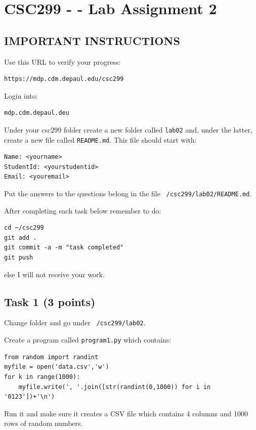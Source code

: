 \documentclass[12pt]{article}
\begin{document}
\section{CSC299 - - Lab Assignment 2}

\subsection*{IMPORTANT INSTRUCTIONS}

Use this URL to verify your progress:
\begin{verbatim}
https://mdp.cdm.depaul.edu/csc299
\end{verbatim}

Login into:
\begin{verbatim}
mdp.cdm.depaul.deu
\end{verbatim}

Under your csc299 folder create a new folder called {\tt lab02} and, under the latter, create a new file called {\tt README.md}. This file should start with:

\begin{verbatim}
Name: <yourname>
StudentId: <yourstudentid>
Email: <youremail>
\end{verbatim}

Put the answers to the questions belong in the file
{\tt ~/csc299/lab02/README.md}.

After completing each task below remember to do:

\begin{verbatim}
cd ~/csc299
git add .
git commit -a -m "task completed"
git push
\end{verbatim}

else I will not receive your work.

\subsection{Task 1 (3 points)}

Change folder and go under {\tt ~/csc299/lab02}.

Create a program called {\tt program1.py} which contains:

\begin{verbatim}
from random import randint
myfile = open('data.csv','w')
for k in range(1000):
    myfile.write(', '.join([str(randint(0,1000)) for i in '0123'])+'\n')
\end{verbatim}

Run it and make sure it creates a CSV file which contains 4 columns and 1000 rows of random numbers.
\end{document}
